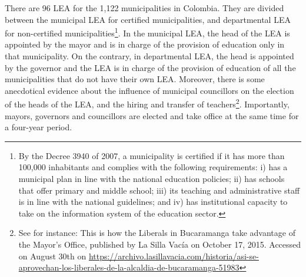 \documentclass[12pt,runningheads]{article}
\begin{document}
There are 96 LEA for the 1,122 municipalities in Colombia. They are divided between the municipal LEA for certified municipalities, and departmental LEA for non-certified municipalities\footnote{By the Decree 3940 of 2007, a municipality is certified if it has more than 100,000 inhabitants and complies with the following requirements: i) has a municipal plan in line with the national education policies; ii) has schools that offer primary and middle school; iii) its teaching and administrative staff is in line with the national guidelines; and iv) has institutional capacity to take on the information system of the education sector.}. In the municipal LEA, the head of the LEA is appointed by the mayor and is in charge of the provision of education only in that municipality. On the contrary, in departmental LEA, the head is appointed by the governor and the LEA is in charge of the provision of education of all the municipalities that do not have their own LEA. Moreover, there is some anecdotical evidence about the influence of municipal councillors on the election of the heads of the LEA, and the hiring and transfer of teachers\footnote{See for instance: This is how the Liberals in
Bucaramanga take advantage of the Mayor’s Office, published by La Silla Vacía on October 17, 2015. Accessed on August 30th on \url{ https://archivo.lasillavacia.com/historia/asi-se-aprovechan-los-liberales-de-la-alcaldia-de-bucaramanga-51983}}. Importantly, mayors, governors and councillors are elected and take office at the same time for a four-year period.
\end{document}

